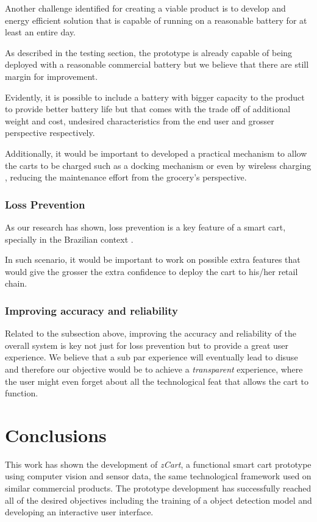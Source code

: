 \documentclass[openright]{normas-utf-tex} %
\begin{document}
Another challenge identified for creating a viable product is to develop and
energy efficient solution that is capable of running on a reasonable battery
for at least an entire day.

As described in the testing section, the prototype is already capable of being
deployed with a reasonable commercial battery but we believe that there are
still margin for improvement.

Evidently, it is possible to include a battery with bigger capacity to the
product to provide better battery life but that comes with the trade off of
additional weight and cost, undesired characteristics from the end user and
grosser perspective respectively.

Additionally, it would be important to developed a practical mechanism to allow
the carts to be charged such as a docking mechanism or even by wireless
charging \cite{Treffers2015}, reducing the maintenance effort from the grocery's
perspective. 

\subsection{Loss Prevention}

As our research has shown, loss prevention is a key feature of a smart cart, specially in the Brazilian context
\cite{Nextop2022}.

In such scenario, it would be important to work on possible extra features that
would give the grosser the extra confidence to deploy the cart to his/her retail
chain.

\subsection{Improving accuracy and reliability}

Related to the subsection above, improving the accuracy and reliability of the
overall system is key not just for loss prevention but to provide a great user
experience. We believe that a sub par experience will eventually lead to disuse
and therefore our objective would be to achieve a \textit{transparent}
experience, where the user might even forget about all the technological feat
that allows the cart to function.

\chapter{Conclusions}

This work has shown the development of \textit{zCart}, a functional smart cart
prototype using computer vision and sensor data, the same technological
framework used on similar commercial products. The prototype development has
successfully reached all of the desired objectives including the training of a
object detection model and developing an interactive user interface.
\end{document}
